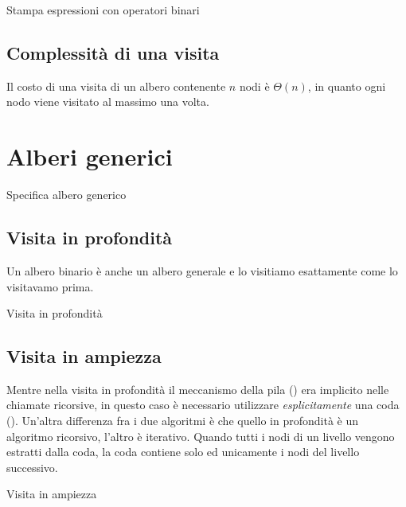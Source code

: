 \begin{algorithm}[H]
	\caption{Stampa espressioni con operatori binari}
	
\end{algorithm}


\subsection*{Complessità di una visita}

Il costo di una visita di un albero contenente \(n\) nodi è \(\Theta(n)\), in quanto ogni nodo viene visitato al massimo una volta.

\clearpage
\section{Alberi generici}

\begin{algorithm}[H]
	\caption{Specifica albero generico}
	
\end{algorithm}

\subsection{Visita in profondità}

Un albero binario è anche un albero generale e lo visitiamo esattamente come lo visitavamo prima.

\begin{algorithm}[H]
	\caption{Visita in profondità}
	
\end{algorithm}

\subsection{Visita in ampiezza}

Mentre nella visita in profondità il meccanismo della pila () era implicito nelle chiamate ricorsive, in questo caso è necessario utilizzare \emph{esplicitamente} una coda ().
Un'altra differenza fra i due algoritmi è che quello in profondità è un algoritmo ricorsivo, l'altro è iterativo.
Quando tutti i nodi di un livello vengono estratti dalla coda, la coda contiene solo ed unicamente i nodi del livello successivo.

\begin{algorithm}[H]
	\caption{Visita in ampiezza}
	
\end{algorithm}

